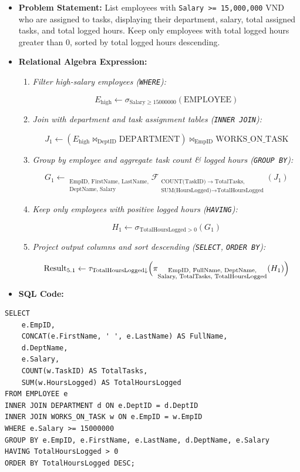 \documentclass[a4paper,12pt]{report}
\begin{document}
\begin{itemize}
\item
  \textbf{Problem Statement:} List employees with \texttt{Salary \textgreater= 15,000,000} VND who are assigned to tasks, displaying their department, salary, total assigned tasks, and total logged hours. Keep only employees with total logged hours greater than 0, sorted by total logged hours descending.
\item
  \textbf{Relational Algebra Expression:}

  \begin{enumerate}
  \def\labelenumi{\arabic{enumi}.}
  \item
    \emph{Filter high-salary employees (\texttt{WHERE}):}

    \[E_{\text{high}} \leftarrow \sigma_{\text{Salary} \geq 15000000}(\text{EMPLOYEE})\]
  \item
    \emph{Join with department and task assignment tables (\texttt{INNER JOIN}):}

    \[J_{1} \leftarrow (E_{\text{high}} \bowtie_{\text{DeptID}} \text{DEPARTMENT}) \bowtie_{\text{EmpID}} \text{WORKS\_ON\_TASK}\]
  \item
    \emph{Group by employee and aggregate task count \& logged hours (\texttt{GROUP BY}):}

    \[G_{1} \leftarrow {}_{\substack{\text{EmpID, FirstName, LastName,} \\ \text{DeptName, Salary}}}\mathcal{F}_{\substack{\text{COUNT(TaskID)} \rightarrow \text{TotalTasks}, \\ \text{SUM(HoursLogged)} \rightarrow \text{TotalHoursLogged}}}(J_{1})\]
  \item
    \emph{Keep only employees with positive logged hours (\texttt{HAVING}):}

    \[H_{1} \leftarrow \sigma_{\text{TotalHoursLogged} > 0}(G_{1})\]
  \item
    \emph{Project output columns and sort descending (\texttt{SELECT}, \texttt{ORDER BY}):}

    \[\text{Result}_{5.1} \leftarrow \tau_{\text{TotalHoursLogged} \downarrow}\Bigl(\pi_{\substack{\text{EmpID, FullName, DeptName,} \\ \text{Salary, TotalTasks, TotalHoursLogged}}}(H_{1})\Bigr)\]
  \end{enumerate}
\item
  \textbf{SQL Code:}
\end{itemize}

\begin{lstlisting}
SELECT 
    e.EmpID,
    CONCAT(e.FirstName, ' ', e.LastName) AS FullName,
    d.DeptName,
    e.Salary,
    COUNT(w.TaskID) AS TotalTasks,
    SUM(w.HoursLogged) AS TotalHoursLogged
FROM EMPLOYEE e
INNER JOIN DEPARTMENT d ON e.DeptID = d.DeptID
INNER JOIN WORKS_ON_TASK w ON e.EmpID = w.EmpID
WHERE e.Salary >= 15000000
GROUP BY e.EmpID, e.FirstName, e.LastName, d.DeptName, e.Salary
HAVING TotalHoursLogged > 0
ORDER BY TotalHoursLogged DESC;
\end{lstlisting}
\end{document}
